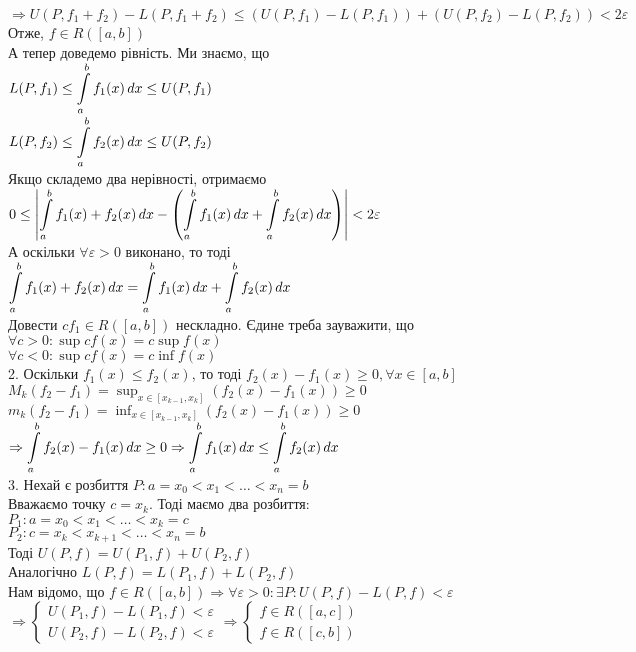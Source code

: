\documentclass[a4paper, 14pt]{extarticle}
\def\huge{\displaystyle}
\def\bigline{\vspace{5mm}\\}
\def\bigline{\vspace{5mm}\\}
\begin{document}
$\Rightarrow U(P,f_1+f_2) - L(P,f_1+f_2) \leq (U(P,f_1) - L(P,f_1)) + (U(P,f_2) - L(P,f_2)) < 2 \varepsilon$\\
Отже, $f \in R([a,b])$\\
А тепер доведемо рівність. Ми знаємо, що\\
$L(P,f_1) \leq \huge\int\displaylimits_a^b f_1(x)\,dx \leq U(P,f_1)$\\
$L(P,f_2) \leq \huge\int\displaylimits_a^b f_2(x)\,dx \leq U(P,f_2)$\\
Якщо складемо два нерівності, отримаємо\\
$0 \leq \abs{\huge \int\displaylimits_a^b f_1(x)+f_2(x)\,dx - \left( \int\displaylimits_a^b f_1(x)\,dx + \int\displaylimits_a^b f_2(x)\,dx \right) } < 2 \varepsilon$\\
А оскільки $\forall \varepsilon > 0$ виконано, то тоді\\
$\huge\int\displaylimits_a^b f_1(x)+f_2(x)\,dx = \int\displaylimits_a^b f_1(x)\,dx + \int\displaylimits_a^b f_2(x)\,dx$
\bigline
Довести $c f_1 \in R([a,b])$ нескладно. Єдине треба зауважити, що\\
$\forall c > 0: \huge\sup cf(x) = c \sup f(x)$\\
$\forall c < 0: \huge\sup cf(x) = c \inf f(x)$
\bigline
2. Оскільки $f_1(x) \leq f_2(x)$, то тоді $f_2(x) - f_1(x) \geq 0, \forall x \in [a,b]$\\
$M_k(f_2-f_1) = \huge \sup_{x \in [x_{k-1}, x_k]} (f_2(x) - f_1(x)) \geq 0$\\
$m_k(f_2-f_1) = \huge \inf_{x \in [x_{k-1}, x_k]} (f_2(x) - f_1(x)) \geq 0$\\
$\Rightarrow \huge \int\displaylimits_a^b f_2(x) - f_1(x)\,dx \geq 0 \Rightarrow \int\displaylimits_a^b f_1(x) \,dx \leq \int\displaylimits_a^b f_2(x) \,dx$
\bigline
3. Нехай є розбиття $P: a = x_0 < x_1 < \dots < x_n = b$\\
Вважаємо точку $c = x_k$. Тоді маємо два розбиття:\\
$P_1: a =x_0 < x_1 < \dots < x_k = c$\\
$P_2: c = x_k < x_{k+1} < \dots < x_n = b$\\
Тоді $U(P,f) = U(P_1,f) + U(P_2,f)$\\
Аналогічно $L(P,f) = L(P_1,f) + L(P_2,f)$\\
Нам відомо, що $f \in R([a,b]) \Rightarrow \forall \varepsilon > 0: \exists P: U(P,f) - L(P,f) < \varepsilon$\\
$\Rightarrow \begin{cases} U(P_1,f) - L(P_1,f) < \varepsilon \\ U(P_2,f) - L(P_2,f) < \varepsilon \end{cases} \Rightarrow \begin{cases} f \in R([a,c]) \\ f \in R([c,b]) \end{cases}$\\
\end{document}
